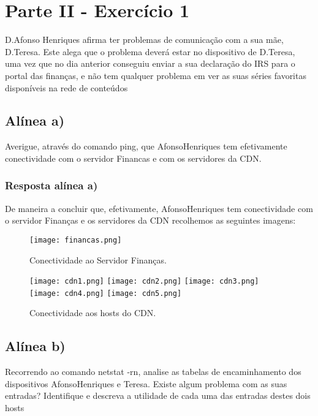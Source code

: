 \documentclass{article}
\begin{document}
\pagebreak

\section{Parte II - Exercício 1}

D.Afonso Henriques afirma ter problemas de comunicação com a sua mãe, D.Teresa. Este alega que o problema
deverá estar no dispositivo de D.Teresa, uma vez que no dia anterior conseguiu enviar a sua declaração do IRS para
o portal das finanças, e não tem qualquer problema em ver as suas séries favoritas disponíveis na rede de conteúdos

\subsection{Alínea a)}

Averigue, através do comando ping, que AfonsoHenriques tem efetivamente conectividade com o servidor Financas e com os servidores da CDN.

\subsubsection{Resposta alínea a)}

De maneira a concluir que, efetivamente, AfonsoHenriques tem conectividade com o servidor Finanças e os servidores da CDN recolhemos as seguintes imagens:
\begin{figure}[h]
    \centering
    \texttt{[image: financas.png]}
    \caption{Conectividade ao Servidor Finanças.}
\end{figure}
\begin{figure}[h]
    \centering
    \texttt{[image: cdn1.png]}
    \texttt{[image: cdn2.png]}
    \texttt{[image: cdn3.png]}
    \texttt{[image: cdn4.png]}
    \texttt{[image: cdn5.png]}
    \caption{Conectividade aos hosts do CDN.}
\end{figure}
\pagebreak

\subsection{Alínea b)}

Recorrendo ao comando netstat -rn, analise as tabelas de encaminhamento dos dispositivos
AfonsoHenriques e Teresa. Existe algum problema com as suas entradas? Identifique e descreva a utilidade
de cada uma das entradas destes dois hosts
\end{document}
